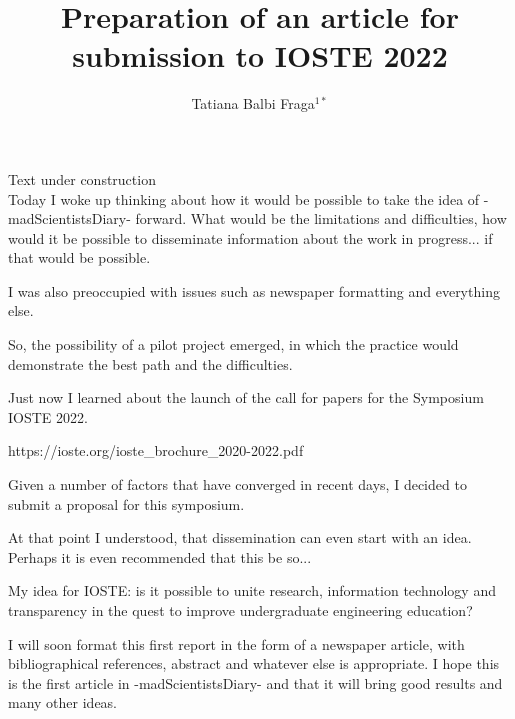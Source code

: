 \documentclass{book}
\title{Preparation of an article for submission to IOSTE 2022}
\author{Tatiana Balbi Fraga$^{1*}$}
\begin{document}
Text under construction \\

Today I woke up thinking about how it would be possible to take the idea of -madScientistsDiary- forward. What would be the limitations and difficulties, how would it be possible to disseminate information about the work in progress... if that would be possible.

I was also preoccupied with issues such as newspaper formatting and everything else.

So, the possibility of a pilot project emerged, in which the practice would demonstrate the best path and the difficulties.

Just now I learned about the launch of the call for papers for the Symposium IOSTE 2022.

https://ioste.org/ioste\_brochure\_2020-2022.pdf

Given a number of factors that have converged in recent days, I decided to submit a proposal for this symposium.

At that point I understood, that dissemination can even start with an idea. Perhaps it is even recommended that this be so...

My idea for IOSTE: is it possible to unite research, information technology and transparency in the quest to improve undergraduate engineering education?

I will soon format this first report in the form of a newspaper article, with bibliographical references, abstract and whatever else is appropriate. I hope this is the first article in -madScientistsDiary- and that it will bring good results and many other ideas.
\end{document}
